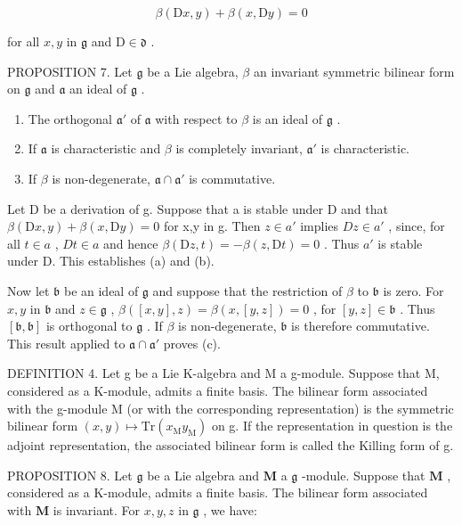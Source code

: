 \[
\beta (\mathrm{D} x, y) + \beta (x, \mathrm{D} y) = 0\tag{14}
\]

for all \(x, y\) in \(\mathfrak{g}\) and \(\mathrm{D} \in \mathfrak{d}\) .

PROPOSITION 7. Let \(\mathfrak{g}\) be a Lie algebra, \(\beta\) an invariant symmetric bilinear form on \(\mathfrak{g}\) and \(\mathfrak{a}\) an ideal of \(\mathfrak{g}\) .

\begin{enumerate}
\def\labelenumi{(\alph{enumi})}
\item
  The orthogonal \(\mathfrak{a}'\) of \(\mathfrak{a}\) with respect to \(\beta\) is an ideal of \(\mathfrak{g}\) .
\item
  If \(\mathfrak{a}\) is characteristic and \(\beta\) is completely invariant, \(\mathfrak{a}'\) is characteristic.
\item
  If \(\beta\) is non-degenerate, \(\mathfrak{a} \cap \mathfrak{a}'\) is commutative.
\end{enumerate}

Let D be a derivation of g. Suppose that a is stable under D and that \(\beta(\mathrm{D}x,y)+\beta(x,\mathrm{D}y)=0\) for x,y in g. Then \(z\in a'\) implies \(Dz\in a'\) , since, for all \(t\in a\) , \(Dt\in a\) and hence \(\beta(\mathrm{D}z,t)=-\beta(z,\mathrm{D}t)=0\) . Thus \(a'\) is stable under D. This establishes (a) and (b).

Now let \(\mathfrak{b}\) be an ideal of \(\mathfrak{g}\) and suppose that the restriction of \(\beta\) to \(\mathfrak{b}\) is zero. For \(x, y\) in \(\mathfrak{b}\) and \(z \in \mathfrak{g}\) , \(\beta ([ x, y ], z) = \beta(x, [y, z]) = 0\) , for \([y, z] \in \mathfrak{b}\) . Thus \([\mathfrak{b}, \mathfrak{b}]\) is orthogonal to \(\mathfrak{g}\) . If \(\beta\) is non-degenerate, \(\mathfrak{b}\) is therefore commutative. This result applied to \(\mathfrak{a} \cap \mathfrak{a}'\) proves (c).

DEFINITION 4. Let g be a Lie K-algebra and M a g-module. Suppose that M, considered as a K-module, admits a finite basis. The bilinear form associated with the g-module M (or with the corresponding representation) is the symmetric bilinear form \((x,y)\mapsto\mathrm{Tr}(x_{\mathrm{M}} y_{\mathrm{M}})\) on g. If the representation in question is the adjoint representation, the associated bilinear form is called the Killing form of g.

PROPOSITION 8. Let \(\mathfrak{g}\) be a Lie algebra and \(\mathbf{M}\) a \(\mathfrak{g}\) -module. Suppose that \(\mathbf{M}\) , considered as a K-module, admits a finite basis. The bilinear form associated with \(\mathbf{M}\) is invariant. For \(x, y, z\) in \(\mathfrak{g}\) , we have:

